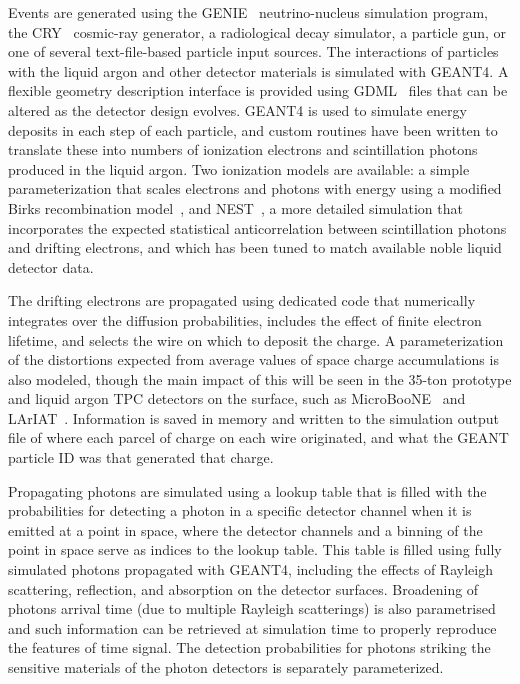 
Events are generated using the GENIE~\cite{genie} neutrino-nucleus
simulation program, the CRY~\cite{cry} cosmic-ray generator, a
radiological decay simulator, a particle gun, or one of several
text-file-based particle input sources.  The interactions of particles
with the liquid argon and other detector materials is simulated with
GEANT4.  A flexible geometry description interface is provided using
GDML~\cite{gdml} files that can be altered as the detector design
evolves.  GEANT4 is used to simulate energy deposits in each step of
each particle, and custom routines have been written to translate
these into numbers of ionization electrons and scintillation photons
produced in the liquid argon.  Two ionization models are available: a
simple parameterization that scales electrons and photons with energy
using a modified Birks recombination model~\cite{birks}, and
NEST~\cite{nest}, a more detailed simulation that incorporates the
expected statistical anticorrelation between scintillation photons and
drifting electrons, and which has been tuned to match available noble
liquid detector data.


The drifting electrons are propagated using dedicated code that
numerically integrates over the diffusion probabilities, includes the
effect of finite electron lifetime, and selects the wire on which to
deposit the charge.  A parameterization of the distortions expected
from average values of space charge accumulations is also modeled,
though the main impact of this will be seen in the 35-ton prototype
and liquid argon TPC detectors on the surface, such as
MicroBooNE~\cite{microboone} and LArIAT~\cite{lariat}.  Information is
saved in memory and written to the simulation output file of where
each parcel of charge on each wire originated, and what the GEANT
particle ID was that generated that charge.

Propagating photons are simulated using a lookup table that is filled
with the probabilities for detecting a photon in a specific detector channel
when it is emitted at a point in space, where the detector channels
and a binning of the point in space serve as indices to the lookup table.
This table is filled using fully simulated photons propagated with GEANT4, including the effects
of Rayleigh scattering, reflection, and absorption on the detector
surfaces.  
Broadening of  photons arrival time (due to multiple Rayleigh scatterings)
is also parametrised and such information can be retrieved at simulation time
to properly reproduce the features of time signal.
The detection probabilities for photons striking the
sensitive materials of the photon detectors is separately
parameterized.


